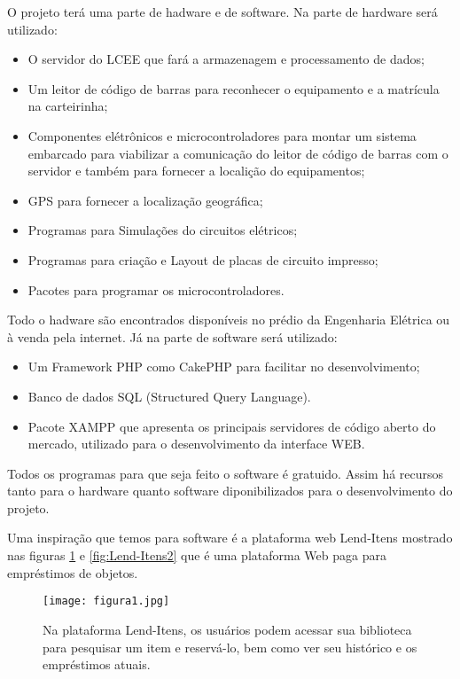\vspace{-42pt}

O projeto terá uma parte de hadware e de software. Na parte de hardware será utilizado:
\begin{itemize}
   \item O servidor do LCEE que fará a armazenagem e processamento de dados; 
   \item Um leitor de código de barras para reconhecer o equipamento e a matrícula na carteirinha;
   \item Componentes elétrônicos e microcontroladores para montar um sistema embarcado para viabilizar a comunicação do leitor de código de barras com o servidor e também para fornecer a localição do equipamentos;
   \item GPS para fornecer a localização geográfica;
   \item Programas para Simulações do circuitos elétricos;
   \item  Programas para criação e Layout de placas de circuito impresso;
   \item  Pacotes para programar os microcontroladores.
\end{itemize}
Todo o hadware são encontrados disponíveis no prédio da Engenharia Elétrica ou à venda pela internet. Já na parte de software será utilizado:
\begin{itemize}
   \item Um Framework PHP como CakePHP para facilitar no desenvolvimento; 
   \item Banco de dados SQL (Structured Query Language).
   \item Pacote XAMPP que apresenta os principais servidores de código aberto do mercado, utilizado para o desenvolvimento da interface WEB.
\end{itemize}

Todos os programas para que seja feito o software é gratuido. Assim há recursos tanto para o hardware quanto software diponibilizados para o desenvolvimento do projeto.

Uma inspiração que temos para software é a plataforma web Lend-Itens mostrado nas figuras \ref{fig:Lend-Itens1} e \ref{fig:Lend-Itens2} que é uma plataforma Web paga para empréstimos de objetos.

\begin{figure}[!h]
	\centering
	\caption{Na plataforma Lend-Itens, os usuários podem acessar sua biblioteca para pesquisar um item e reservá-lo, bem como ver seu histórico e os empréstimos atuais.}
	\texttt{[image: figura1.jpg]}
	\label{fig:Lend-Itens1}
\end{figure}

